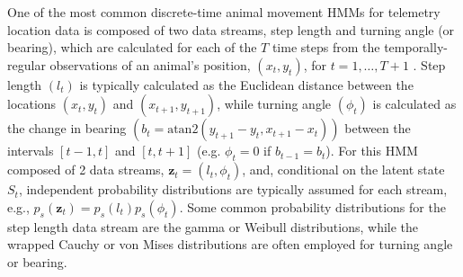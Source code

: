 \documentclass[12pt]{article}\usepackage[]{graphicx}\usepackage[]{color}
\begin{document}
One of the most common discrete-time animal movement HMMs for telemetry location data is composed of two data streams, step length and turning angle (or bearing), which are calculated for each of the $T$ time steps from the temporally-regular observations of an animal's position, $(x_t,y_t)$, for $t=1,\ldots,T+1$ \citep[e.g.][]{MoralesEtAl2004,LangrockEtAl2012,McClintockEtAl2012}. Step length $(l_t)$ is typically calculated as the Euclidean distance between the locations $(x_t,y_t)$ and $(x_{t+1},y_{t+1})$, while turning angle $(\phi_t)$ is calculated as the change in bearing $\left(b_t=\text{atan2}(y_{t+1}-y_t,x_{t+1}-x_t)\right)$ between the intervals $[t-1,t]$ and $[t,t+1]$ (e.g. $\phi_t=0$ if $b_{t-1}=b_t$). For this HMM composed of 2 data streams, ${\mathbf z}_t=(l_t,\phi_t)$, and, conditional on the latent state $S_t$, independent probability distributions are typically assumed for each stream, e.g., $p_s({\mathbf z}_t)=p_s(l_t)p_s(\phi_t)$. Some common probability distributions for the step length data stream are the gamma or Weibull distributions, while the wrapped Cauchy or von Mises distributions are often employed for turning angle or bearing.
\end{document}
